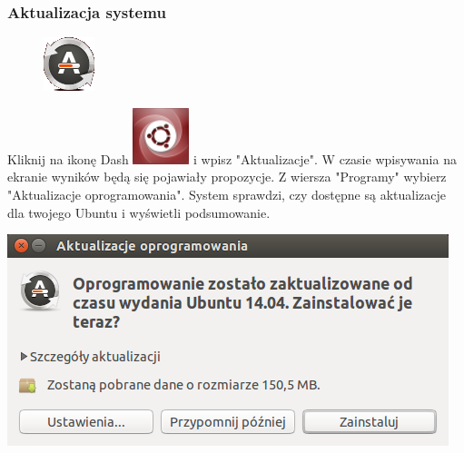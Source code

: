 \subsubsection{Aktualizacja systemu}
\label{rzeczy_do_zrobienia_po_instalacji}
\begin{figure}
        \includegraphics[width=\linewidth]{images/pierwsze_uruchomienie_aktualizacja1.png}
\end{figure}

Kliknij na ikonę Dash \includegraphics[scale=0.35]{images/ikony_dash.png} i wpisz "Aktualizacje". W czasie wpisywania na ekranie wyników będą się pojawiały propozycje. Z wiersza "Programy" wybierz "Aktualizacje oprogramowania".
System sprawdzi, czy dostępne są aktualizacje dla twojego Ubuntu i wyświetli podsumowanie.
\begin{center}
        \includegraphics{images/pierwsze_uruchomienie_aktualizacja2.png}
\end{center}


